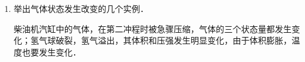 \begin{enumerate}
\begin{solution}
\[\begin{split}
    p_{1}=p_0-\rho gh_1
    &=(1.013\x10^5-13.6\x10^3\x9.8\x0.20)\\
    &=7.4\x 10^4{\rm Pa}\\
    p_{2}=p_0+\rho_{\text{水}} gh_2
    &=(1.013\x10^5+1.0\x10^3\x9.8\x 20)\\
    &=2.97\x 10^5{\rm Pa}\\
    p_{3}=p_0+\rho_{\text{水}} gh_3
    &=[1.013\x10^5+1.0\x10^3\x9.8\x(0.85-0.10)]\\
    &=1.87\x 10^5{\rm Pa}\\
\end{split}\]  
\end{solution}
	\item 举出气体状态发生改变的几个实例．

\begin{solution}
 柴油机汽缸中的气体，在第二冲程时被急骤压缩，气体的三个状态量都发生变化；氢气球破裂，氢气溢出，其体积和压强发生明显变化，由于体积膨胀，温度也要发生变化．   
\end{solution}
\end{enumerate}

